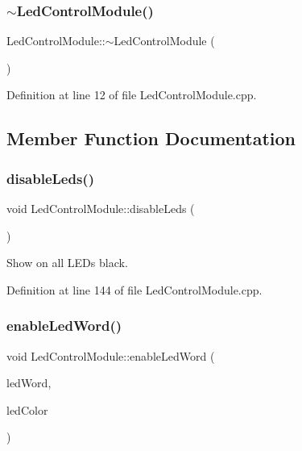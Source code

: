 \mbox{\label{class_led_control_module_af6763089aa43e6be196651ec6708a4cd}} 
\subsubsection{\texorpdfstring{$\sim$LedControlModule()}{~LedControlModule()}}
{\footnotesize\ttfamily Led\+Control\+Module\+::$\sim$\+Led\+Control\+Module (\begin{DoxyParamCaption}{ }\end{DoxyParamCaption})}



Definition at line 12 of file Led\+Control\+Module.\+cpp.



\subsection{Member Function Documentation}
\mbox{\label{class_led_control_module_abd6255fc5d3a54b5befd131e56674313}} 
\subsubsection{\texorpdfstring{disableLeds()}{disableLeds()}}
{\footnotesize\ttfamily void Led\+Control\+Module\+::disable\+Leds (\begin{DoxyParamCaption}{ }\end{DoxyParamCaption})}

Show on all L\+E\+Ds black. 

Definition at line 144 of file Led\+Control\+Module.\+cpp.

\mbox{\label{class_led_control_module_a5870c6c37010e51f6b3dbe4611a1c05c}} 
\subsubsection{\texorpdfstring{enableLedWord()}{enableLedWord()}}
{\footnotesize\ttfamily void Led\+Control\+Module\+::enable\+Led\+Word (\begin{DoxyParamCaption}\item[{const \mbox{\hyperlink{class_led_word}{Led\+Word}} $\ast$}]{led\+Word,  }\item[{const Rgbw\+Color \&}]{led\+Color }\end{DoxyParamCaption})\hspace{0.3cm}{\ttfamily [private]}}

